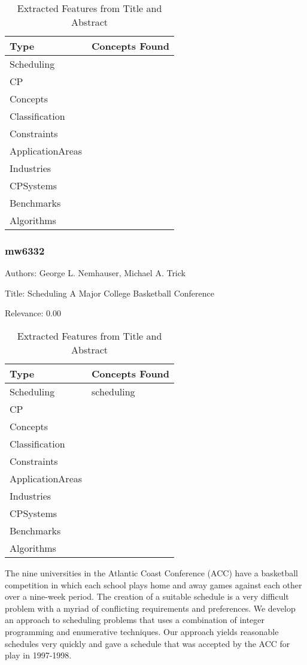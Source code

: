 {\scriptsize
\begin{longtable}{p{2cm}p{20cm}}
\caption{Extracted Features from Title and Abstract}\\ \toprule
Type & Concepts Found\\ \midrule
\endhead
\bottomrule
\endfoot
Scheduling & \\ 
CP & \\ 
Concepts & \\ 
Classification & \\ 
Constraints & \\ 
ApplicationAreas & \\ 
Industries & \\ 
CPSystems & \\ 
Benchmarks & \\ 
Algorithms & \\ 
\end{longtable}
}



\subsubsection{mw6332}
\label{mw:mw6332}

Authors: George L. Nemhauser, Michael A. Trick

Title: Scheduling A Major College Basketball Conference

Relevance:  0.00

{\scriptsize
\begin{longtable}{p{2cm}p{20cm}}
\caption{Extracted Features from Title and Abstract}\\ \toprule
Type & Concepts Found\\ \midrule
\endhead
\bottomrule
\endfoot
Scheduling & scheduling\\ 
CP & \\ 
Concepts & \\ 
Classification & \\ 
Constraints & \\ 
ApplicationAreas & \\ 
Industries & \\ 
CPSystems & \\ 
Benchmarks & \\ 
Algorithms & \\ 
\end{longtable}
}

  The nine universities in the Atlantic Coast Conference (ACC) have a basketball competition in which each school plays home and away games against each other over a nine-week period. The creation of a suitable schedule is a very difficult problem with a myriad of conflicting requirements and preferences. We develop an approach to scheduling problems that uses a combination of integer programming and enumerative techniques. Our approach yields reasonable schedules very quickly and gave a schedule that was accepted by the ACC for play in 1997-1998.  

